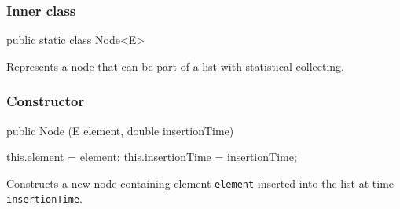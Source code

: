 \subsubsection*{Inner class}

\begin{code}

   public static class Node<E>\begin{hide} {
      private E element;
      private double insertionTime;\end{hide}
\end{code}
\begin{tabb}   Represents a node that can be part of a list with
  statistical collecting.
\end{tabb}
\subsubsection*{Constructor}
\begin{code}

      public Node (E element, double insertionTime)\begin{hide} {
         this.element = element;
         this.insertionTime = insertionTime;
      }\end{hide}
\end{code}
\begin{tabbb}  Constructs a new node containing element
  \texttt{element}
  inserted into the list at time \texttt{insertionTime}.
\end{tabbb}
\begin{htmlonly}
\end{htmlonly}
